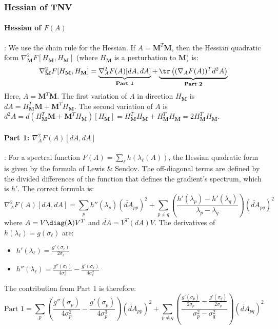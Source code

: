 \subsubsection{Hessian of TNV}

\paragraph{Hessian of $F(A)$}:
We use the chain rule for the Hessian. If $A = \mathbf{M}^T \mathbf{M}$, then the Hessian quadratic form $\nabla_{\mathbf{M}}^2 F[H_{\mathbf{M}},H_{\mathbf{M}}]$ (where $H_{\mathbf{M}}$ is a perturbation to $\mathbf{M}$) is:
\[
\nabla_{\mathbf{M}}^2 F[H_{\mathbf{M}},H_{\mathbf{M}}] = \underbrace{\nabla_A^2 F(A)[dA, dA]}_{\textbf{Part 1}} + \underbrace{\tr\left((\nabla_A F(A))^T d^2A\right)}_{\textbf{Part 2}}
\]
Here, $A = \mathbf{M}^T \mathbf{M}$.
The first variation of $A$ in direction $H_{\mathbf{M}}$ is $dA = H_{\mathbf{M}}^T \mathbf{M} + \mathbf{M}^T H_{\mathbf{M}}$.
The second variation of $A$ is $d^2A = d(H_{\mathbf{M}}^T \mathbf{M} + \mathbf{M}^T H_{\mathbf{M}})[H_{\mathbf{M}}] = H_{\mathbf{M}}^T H_{\mathbf{M}} + H_{\mathbf{M}}^T H_{\mathbf{M}} = 2H_{\mathbf{M}}^T H_{\mathbf{M}}$.

\paragraph{Part 1: $\nabla_A^2 F(A)[dA, dA]$}:
For a spectral function $F(A) = \sum_\ell h(\lambda_\ell(A))$, the Hessian quadratic form is given by the formula of Lewis \& Sendov. The off-diagonal terms are defined by the divided differences of the function that defines the gradient's spectrum, which is $h'$.
The correct formula is:
$$\nabla_A^2 F(A)[dA, dA] = \sum_p h''(\lambda_p) (\widetilde{dA}_{pp})^2 + \sum_{p \neq q} \left(\frac{h'(\lambda_p) - h'(\lambda_q)}{\lambda_p - \lambda_q}\right) (\widetilde{dA}_{pq})^2$$
where $A = V \diag(\boldsymbol{\lambda}) V^T$ and $\widetilde{dA} = V^T (dA) V$.
The derivatives of $h(\lambda_\ell) = g(\sigma_\ell)$ are:
\begin{itemize}
    \item $h'(\lambda_\ell) = \frac{g'(\sigma_\ell)}{2\sigma_\ell}$
    \item $h''(\lambda_\ell) = \frac{g''(\sigma_\ell)}{4\sigma_\ell^2} - \frac{g'(\sigma_\ell)}{4\sigma_\ell^3}$
\end{itemize}
The contribution from Part 1 is therefore:
$$\text{Part 1} = \sum_p \left(\frac{g''(\sigma_p)}{4\sigma_p^2} - \frac{g'(\sigma_p)}{4\sigma_p^3}\right) (\widetilde{dA}_{pp})^2 + \sum_{p \neq q} \left(\frac{\frac{g'(\sigma_p)}{2\sigma_p} - \frac{g'(\sigma_q)}{2\sigma_q}}{\sigma_p^2 - \sigma_q^2}\right) (\widetilde{dA}_{pq})^2$$

